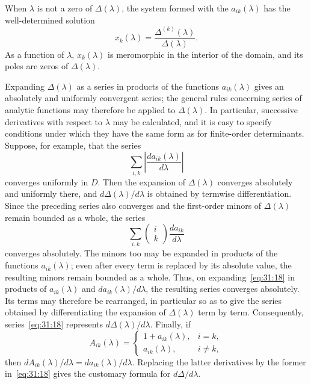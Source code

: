 \documentclass[
  paper=b5,
  fontsize=13pt,
  twoside=true,
  open=any,
  bookmarkpackage=false,
  chapterprefix=true,
  headings=normal
]{scrbook}
\theoremstyle{definition}
\begin{document}
When $\lambda$ is not a zero of $\Delta(\lambda)$, the system formed with the $a_{ik}(\lambda)$ has the well-determined solution
\[
 x_k(\lambda)=\frac{\Delta^{(k)}(\lambda)}{\Delta(\lambda)}.
\]
As a function of $\lambda$, $x_k(\lambda)$ is meromorphic in the interior of the domain, and its poles are zeros of $\Delta(\lambda)$.

Expanding $\Delta(\lambda)$ as a series in products of the functions $a_{ik}(\lambda)$ gives an absolutely and uniformly convergent series; the general rules concerning series of analytic functions may therefore be applied to $\Delta(\lambda)$. In particular, successive derivatives with respect to $\lambda$ may be calculated, and it is easy to specify conditions under which they have the same form as for finite-order determinants. Suppose, for example, that the series
\[
 \sum_{i,k}\left|\frac{d a_{ik}(\lambda)}{d\lambda}\right|
\]
converges uniformly in $D$. Then the expansion of $\Delta(\lambda)$ converges absolutely and uniformly there, and $d\Delta(\lambda)/d\lambda$ is obtained by termwise differentiation. Since the preceding series also converges and the first-order minors of $\Delta(\lambda)$ remain bounded as a whole, the series
\begin{equation}
 \sum_{i,k}
 \left(\begin{matrix}i\\k\end{matrix}\right)
 \frac{d a_{ik}}{d\lambda}
 \tag{18}\label{eq:31:18}
\end{equation}
converges absolutely. The minors too may be expanded in products of the functions $a_{ik}(\lambda)$; even after every term is replaced by its absolute value, the resulting minors remain bounded as a whole. Thus, on expanding~\eqref{eq:31:18} in products of $a_{ik}(\lambda)$ and $d a_{ik}(\lambda)/d\lambda$, the resulting series converges absolutely. Its terms may therefore be rearranged, in particular so as to give the series obtained by differentiating the expansion of $\Delta(\lambda)$ term by term. Consequently, series~\eqref{eq:31:18} represents
$d\Delta(\lambda)/d\lambda$. Finally, if
\[
 A_{ik}(\lambda)=
 \begin{cases}
 1+a_{ik}(\lambda),&i=k,\\
 a_{ik}(\lambda),&i\ne k,
 \end{cases}
\]
then $dA_{ik}(\lambda)/d\lambda=da_{ik}(\lambda)/d\lambda$. Replacing the latter derivatives by the former in~\eqref{eq:31:18} gives the customary formula for $d\Delta/d\lambda$.
\end{document}
